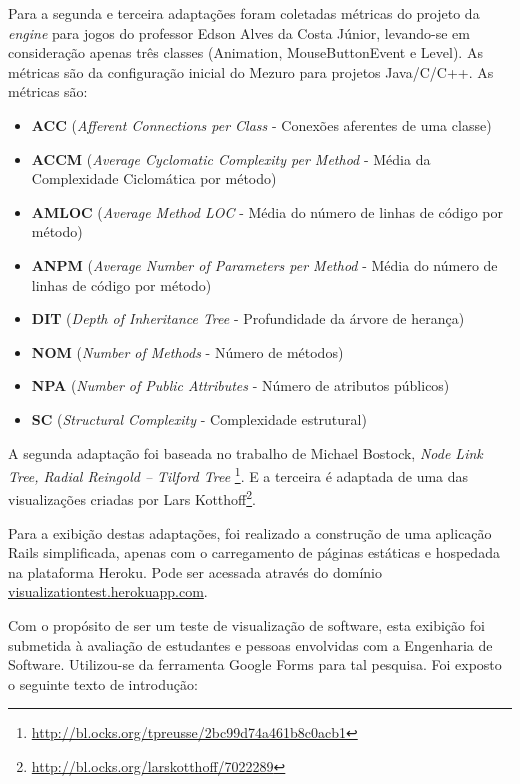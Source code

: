 Para a segunda e terceira adaptações foram coletadas métricas do projeto da
\textit{engine} para jogos do professor Edson Alves da Costa Júnior, levando-se
em consideração apenas três classes (Animation, MouseButtonEvent e Level). As
métricas são da configuração inicial do Mezuro para projetos Java/C/C++. As
métricas são:


\begin{itemize}
  \item \textbf{ACC} (\textit{Afferent Connections per Class} - Conexões
	aferentes de uma classe)
  \item \textbf{ACCM} (\textit{Average Cyclomatic Complexity per Method} -
	Média da Complexidade Ciclomática por método)
  \item \textbf{AMLOC} (\textit{Average Method LOC} - Média do número de linhas
	de código por método)
  \item \textbf{ANPM} (\textit{Average Number of Parameters per Method} - Média
	do número de linhas de código por método)
  \item \textbf{DIT} (\textit{Depth of Inheritance Tree} - Profundidade da
	árvore de herança)
  \item \textbf{NOM} (\textit{Number of Methods} - Número de métodos)
  \item \textbf{NPA} (\textit{Number of Public Attributes} - Número de
	atributos públicos)
  \item \textbf{SC} (\textit{Structural Complexity} - Complexidade estrutural)
\end{itemize}

A segunda adaptação foi baseada no trabalho de Michael Bostock, \textit{Node
Link Tree, Radial Reingold – Tilford Tree}
\footnote{\url{http://bl.ocks.org/tpreusse/2bc99d74a461b8c0acb1}}. E a terceira
é adaptada de uma das visualizações criadas por Lars Kotthoff\footnote{\url{http://bl.ocks.org/larskotthoff/7022289}}.

Para a exibição destas adaptações, foi realizado a construção de uma aplicação
Rails simplificada, apenas com o carregamento de páginas estáticas e hospedada
na plataforma Heroku. Pode ser acessada através do domínio \href{https://visualizationtest.herokuapp.com/}{visualizationtest.herokuapp.com}.

Com o propósito de ser um teste de visualização de software, esta exibição foi
submetida à avaliação de estudantes e pessoas envolvidas com a Engenharia de
Software. Utilizou-se da ferramenta Google Forms para tal pesquisa. Foi exposto
o seguinte texto de introdução:



